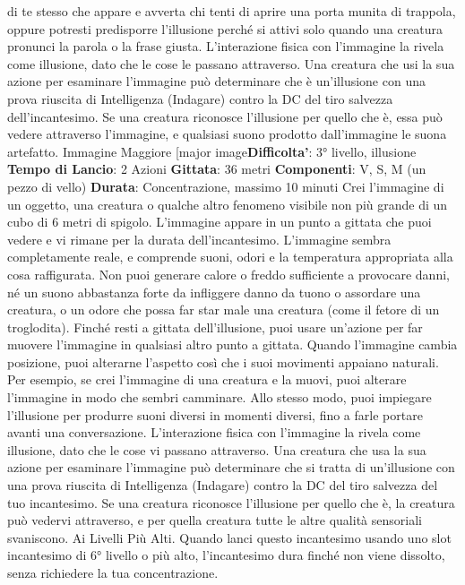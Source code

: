 \begin{multicols}{2}
di te stesso che appare e avverta chi tenti di aprire una
porta munita di trappola, oppure potresti predisporre
l’illusione perché si attivi solo quando una creatura
pronunci la parola o la frase giusta.
L’interazione fisica con l’immagine la rivela come
illusione, dato che le cose le passano attraverso. Una
creatura che usi la sua azione per esaminare
l’immagine può determinare che è un’illusione con una
prova riuscita di Intelligenza (Indagare) contro la DC del
tiro salvezza dell’incantesimo. Se una creatura
riconosce l’illusione per quello che è, essa può vedere
attraverso l’immagine, e qualsiasi suono prodotto
dall’immagine le suona artefatto.
Immagine Maggiore
[major image\textbf{Difficolta'}:
3° livello, illusione
\textbf{Tempo di Lancio}: 2 Azioni
\textbf{Gittata}: 36 metri
\textbf{Componenti}: V, S, M (un pezzo di vello)
\textbf{Durata}: Concentrazione, massimo 10 minuti
Crei l’immagine di un oggetto, una creatura o qualche
altro fenomeno visibile non più grande di un cubo di 6
metri di spigolo. L’immagine appare in un punto a
gittata che puoi vedere e vi rimane per la durata
dell’incantesimo. L’immagine sembra completamente
reale, e comprende suoni, odori e la temperatura
appropriata alla cosa raffigurata. Non puoi generare
calore o freddo sufficiente a provocare danni, né un
suono abbastanza forte da infliggere danno da tuono o
assordare una creatura, o un odore che possa far star
male una creatura (come il fetore di un troglodita).
Finché resti a gittata dell’illusione, puoi usare un’azione
per far muovere l’immagine in qualsiasi altro punto a
gittata. Quando l’immagine cambia posizione, puoi
alterarne l’aspetto così che i suoi movimenti appaiano
naturali. Per esempio, se crei l’immagine di una
creatura e la muovi, puoi alterare l’immagine in modo
che sembri camminare. Allo stesso modo, puoi
impiegare l’illusione per produrre suoni diversi in
momenti diversi, fino a farle portare avanti una
conversazione.
L’interazione fisica con l’immagine la rivela come
illusione, dato che le cose vi passano attraverso. Una
creatura che usa la sua azione per esaminare
l’immagine può determinare che si tratta di un’illusione
con una prova riuscita di Intelligenza (Indagare) contro
la DC del tiro salvezza del tuo incantesimo. Se una
creatura riconosce l’illusione per quello che è, la
creatura può vedervi attraverso, e per quella creatura
tutte le altre qualità sensoriali svaniscono.
Ai Livelli Più Alti. Quando lanci questo incantesimo
usando uno slot incantesimo di 6° livello o più alto,
l’incantesimo dura finché non viene dissolto, senza
richiedere la tua concentrazione.

\end{multicols}
